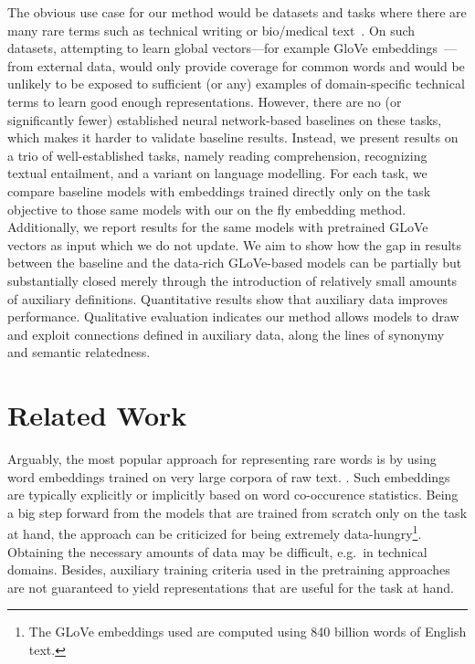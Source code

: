The obvious use case for our method would be datasets and tasks where there are many rare terms such as technical writing or bio/medical text~\citep{deleger2016overview}. On such datasets, attempting to learn global vectors---for example GloVe embeddings~\citep{pennington2014glove}---from external data, would only provide coverage for common words and would be unlikely to be exposed to sufficient (or any) examples of domain-specific technical terms to learn good enough representations. However, there are no (or significantly fewer) established neural network-based baselines on these tasks, which makes it harder to validate baseline results. Instead, we present results on a trio of well-established tasks, namely reading comprehension, 
recognizing textual entailment, and a variant on language modelling. For each task, we compare baseline models with embeddings trained directly only on the task objective to those same models with our on the fly embedding method. Additionally, we report results for the same models with pretrained GLoVe vectors as input which we do not update. We aim to show how the gap in results between the baseline and the data-rich GLoVe-based models can be partially but substantially closed merely through the introduction of relatively small amounts of auxiliary definitions. Quantitative results show that auxiliary data improves performance. Qualitative evaluation indicates our method allows models to draw and exploit connections defined in auxiliary data, along the lines of synonymy and semantic relatedness. 


\section{Related Work}
\label{sec:related}

Arguably, the most popular approach for representing rare words is by using word embeddings trained on very large corpora of raw text.
\citep{mikolov2013distributed,pennington2014glove}. Such embeddings are typically explicitly or implicitly based on word co-occurence statistics. Being a big step forward from the models that are trained from scratch only on the task at hand, the approach can be criticized for being extremely data-hungry\footnote{The GLoVe embeddings used are computed using 840 billion words of English text.}. Obtaining the necessary amounts of data may be difficult, e.g.~in technical domains. Besides, auxiliary training criteria used in the pretraining approaches are not guaranteed to yield representations that are useful for the task at hand.

